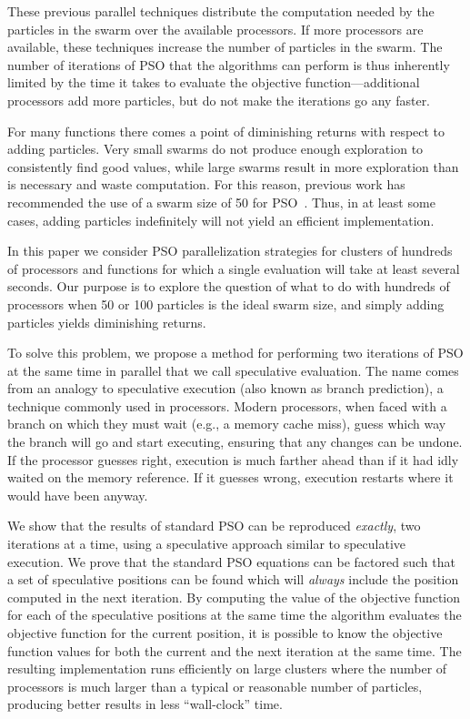 \documentclass{llncs}
\begin{document}
These previous parallel techniques distribute the computation needed by the
particles in the swarm over the available processors.  If more processors are
available, these techniques increase the number of particles in the swarm.  The
number of iterations of PSO that the algorithms can perform is thus inherently
limited by the time it takes to evaluate the objective function---additional
processors add more particles, but do not make the iterations go any faster.

For many functions there comes a point of diminishing returns with respect to
adding particles.  Very small swarms do not produce enough exploration to
consistently find good values, while large swarms result in more exploration
than is necessary and waste computation.  For this reason, previous work has
recommended the use of a swarm size of 50 for
PSO~\cite{bratton-2007-defining-a-standard-for-pso}.  Thus, in at least some
cases, adding particles indefinitely will not yield an efficient
implementation. 

In this paper we consider PSO parallelization strategies for clusters of
hundreds of processors and functions for which a single evaluation will take at
least several seconds.  Our purpose is to explore the question of what to do
with hundreds of processors when 50 or 100 particles is the ideal swarm size,
and simply adding particles yields diminishing returns.

To solve this problem, we propose a method for performing two iterations of PSO
at the same time in parallel that we call speculative evaluation.  The name
comes from an analogy to speculative execution (also known as branch
prediction), a technique commonly used in processors.  Modern processors, when
faced with a branch on which they must wait (e.g., a memory cache miss), guess
which way the branch will go and start executing, ensuring that any changes can
be undone.  If the processor guesses right, execution is much farther ahead
than if it had idly waited on the memory reference.  If it guesses wrong,
execution restarts where it would have been anyway.  

We show that the results of standard PSO can be reproduced \emph{exactly}, two
iterations at a time, using a speculative approach similar to speculative
execution. We prove that the standard PSO equations can be factored such that a
set of speculative positions can be found which will \emph{always} include the
position computed in the next iteration.  By computing the value of the
objective function for each of the speculative positions at the same time the
algorithm evaluates the objective function for the current position, it is
possible to know the objective function values for both the current and the
next iteration at the same time.  The resulting implementation runs efficiently
on large clusters where the number of processors is much larger than a typical
or reasonable number of particles, producing better results in less
``wall-clock'' time.
\end{document}
